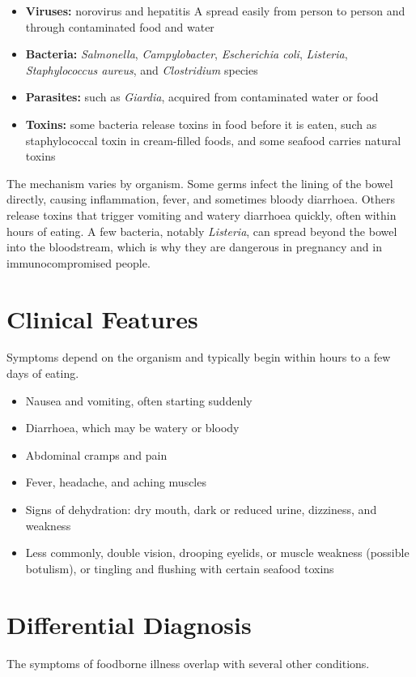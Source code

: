 \begin{itemize}
    \item \textbf{Viruses:} norovirus and hepatitis A spread easily from person to person and through contaminated food and water
    \item \textbf{Bacteria:} \textit{Salmonella}, \textit{Campylobacter}, \textit{Escherichia coli}, \textit{Listeria}, \textit{Staphylococcus aureus}, and \textit{Clostridium} species
    \item \textbf{Parasites:} such as \textit{Giardia}, acquired from contaminated water or food
    \item \textbf{Toxins:} some bacteria release toxins in food before it is eaten, such as staphylococcal toxin in cream-filled foods, and some seafood carries natural toxins
\end{itemize}

The mechanism varies by organism. Some germs infect the lining of the bowel directly, causing inflammation, fever, and sometimes bloody diarrhoea. Others release toxins that trigger vomiting and watery diarrhoea quickly, often within hours of eating. A few bacteria, notably \textit{Listeria}, can spread beyond the bowel into the bloodstream, which is why they are dangerous in pregnancy and in immunocompromised people.

\section*{Clinical Features}
Symptoms depend on the organism and typically begin within hours to a few days of eating.

\begin{itemize}
    \item Nausea and vomiting, often starting suddenly
    \item Diarrhoea, which may be watery or bloody
    \item Abdominal cramps and pain
    \item Fever, headache, and aching muscles
    \item Signs of dehydration: dry mouth, dark or reduced urine, dizziness, and weakness
    \item Less commonly, double vision, drooping eyelids, or muscle weakness (possible botulism), or tingling and flushing with certain seafood toxins
\end{itemize}

\section*{Differential Diagnosis}
The symptoms of foodborne illness overlap with several other conditions.

